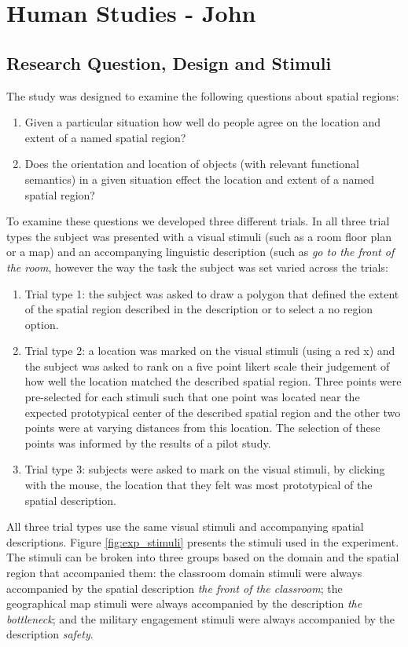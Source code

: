 \documentclass[11pt,letterpaper]{article}
\begin{document}
\section{Human Studies - John}

\subsection{Research Question, Design and Stimuli}

The study was designed to examine the following questions about spatial regions:
\begin{enumerate}
	\item Given a particular situation how well do people agree on the location and extent of a named spatial region?
	\item Does the orientation and location of objects (with relevant functional semantics) in a given situation effect the location and extent of a named spatial region?
\end{enumerate}

To examine these questions we developed three different trials. In all three trial types the subject was presented with a visual stimuli (such as a room floor plan or a map) and an accompanying linguistic description (such as \emph{go to the front of the room}, however the way the task the subject was set varied across the trials:
\begin{enumerate}
	\item Trial type 1: the subject was asked to draw a polygon that defined the extent of the spatial region described in the description or to select a no region option.
	\item Trial type 2: a location was marked on the visual stimuli (using a red x) and the subject was asked to rank on a five point likert scale their judgement of how well the location matched the described spatial region. Three points were pre-selected for each stimuli such that one point was located near the expected prototypical center of the described spatial region and the other two points were at varying distances from this location. The selection of these points was informed by the results of a pilot study. 
	\item Trial type 3: subjects were asked to mark on the visual stimuli, by clicking with the mouse, the location that they felt was most prototypical of the spatial description. 
\end{enumerate}

All three trial types use the same visual stimuli and accompanying spatial descriptions. Figure \ref{fig:exp_stimuli} presents the stimuli used in the experiment. The stimuli can be broken into three groups based on the domain and the spatial region that accompanied them: the classroom domain stimuli were always accompanied by the spatial description \emph{the front of the classroom}; the geographical map stimuli were always accompanied by the description \emph{the bottleneck}; and the military engagement stimuli were always accompanied by the description \emph{safety}. 
\end{document}
